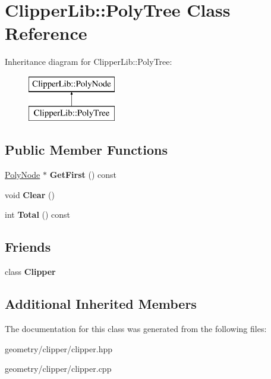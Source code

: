\hypertarget{class_clipper_lib_1_1_poly_tree}{}\section{Clipper\+Lib\+:\+:Poly\+Tree Class Reference}
\label{class_clipper_lib_1_1_poly_tree}
Inheritance diagram for Clipper\+Lib\+:\+:Poly\+Tree\+:\begin{figure}[H]
\begin{center}
\leavevmode
\includegraphics[height=2.000000cm]{class_clipper_lib_1_1_poly_tree}
\end{center}
\end{figure}
\subsection*{Public Member Functions}
\begin{DoxyCompactItemize}
\item 
\mbox{\label{class_clipper_lib_1_1_poly_tree_a8b88b8d6225281ee7d536902b0d04e9e}} 
\mbox{\hyperlink{class_clipper_lib_1_1_poly_node}{Poly\+Node}} $\ast$ {\bfseries Get\+First} () const
\item 
\mbox{\label{class_clipper_lib_1_1_poly_tree_a8620ea631d478b3c43274ac084902ec4}} 
void {\bfseries Clear} ()
\item 
\mbox{\label{class_clipper_lib_1_1_poly_tree_ad0d3c974bab5a30cc8c916da9fe14388}} 
int {\bfseries Total} () const
\end{DoxyCompactItemize}
\subsection*{Friends}
\begin{DoxyCompactItemize}
\item 
\mbox{\label{class_clipper_lib_1_1_poly_tree_a4d39a09ecdddeeb85930dd4554a54b3c}} 
class {\bfseries Clipper}
\end{DoxyCompactItemize}
\subsection*{Additional Inherited Members}


The documentation for this class was generated from the following files\+:\begin{DoxyCompactItemize}
\item 
geometry/clipper/clipper.\+hpp\item 
geometry/clipper/clipper.\+cpp\end{DoxyCompactItemize}
